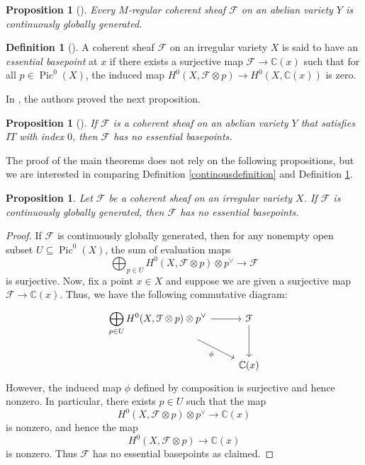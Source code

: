 \documentclass[sn-mathphys-num]{sn-jnl}%
\newcommand{\C}{\mathbb{C}}
\newtheorem{proposition}[theorem]{Proposition}
\theoremstyle{definition}
\newtheorem{defn}[theorem]{Definition}
\numberwithin{equation}{section}
\begin{document}
\begin{proposition}[{\cite[Proposition 2.13]{popapareschi1}}]\label{propoMregularity}
    Every $M$-regular coherent sheaf $\mathcal{F}$ on an abelian variety $Y$ is continuously globally generated.
\end{proposition}
\begin{defn}[{\cite[Definition 2.2]{haconchen}}]\label{essantialdefinition}
A coherent sheaf $\mathcal{F}$ on an irregular variety $X$ is said to have an \emph{essential basepoint} at $x$ if there exists a surjective map $\mathcal{F} \to \C(x)$ such that for all $p \in \operatorname{Pic}^{0}(X)$, the induced map $H^{0}(X, \mathcal{F} \otimes p ) \to H^{0}(X, \C(x))$ is zero.
\end{defn}
\par In \cite{haconchen}, the authors proved the next proposition.
\begin{proposition}[{\cite[Proposition 2.3]{haconchen}}]\label{haconchenproposition}
If $\mathcal{F}$ is a coherent  sheaf on an abelian variety $Y$  that satisfies $IT$ with index $0$, then $\mathcal{F}$ has no essential basepoints.
\end{proposition}
\par The proof of the main theorems does not rely on the following propositions, but we are interested in comparing Definition \ref{continousdefinition} and Definition \ref{essantialdefinition}.
\begin{proposition}\label{premierproposition}
Let $\mathcal{F}$ be a coherent sheaf on an irregular variety $X$. If $\mathcal{F}$ is continuously globally generated, then $\mathcal{F}$ has no essential basepoints.
\end{proposition}
\begin{proof}
If $\mathcal{F}$ is continuously globally generated, then for any nonempty open subset $U \subseteq \operatorname{Pic}^{0}(X)$, the sum of evaluation maps  
\[
\bigoplus_{p \in U} H^{0}(X, \mathcal{F} \otimes p) \otimes p^{\vee} \to \mathcal{F} 
\]
is surjective. Now,  fix a point $x \in X$ and suppose we are given a surjective map $\mathcal{F} \to \C(x)$. Thus, we have the following commutative diagram:
\[\begin{tikzcd}
\displaystyle \bigoplus_{p \in U} {H^{0}(X, \mathcal{F} \otimes p) \otimes p^{\vee}} \arrow[r]
\arrow{rd}[swap]{\phi} & \mathcal{F} \arrow[d]\\
& \C(x)
\end{tikzcd}
\]
However, the induced map $\phi$ defined by composition is surjective and hence nonzero. In particular, there exists $p \in U$ such that the map $$H^{0}(X, \mathcal{F} \otimes p ) \otimes p^{\vee} \to  \C(x)$$ is nonzero, and hence the map
\[
H^{0}(X, \mathcal{F} \otimes p) \to\C(x)
\]
is nonzero. Thus $\mathcal{F}$ has no essential basepoints as claimed.
\end{proof}
\end{document}
